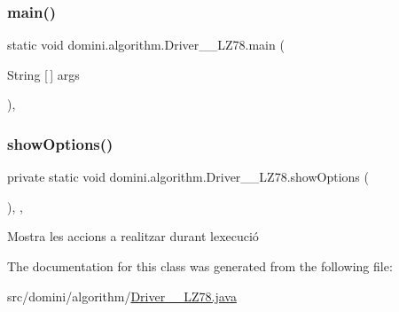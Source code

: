 \subsubsection{\texorpdfstring{main()}{main()}}
{\footnotesize\ttfamily static void domini.\+algorithm.\+Driver\+\_\+\+\_\+\+L\+Z78.\+main (\begin{DoxyParamCaption}\item[{String \mbox{[}$\,$\mbox{]}}]{args }\end{DoxyParamCaption})\hspace{0.3cm}{\ttfamily [inline]}, {\ttfamily [static]}}

\mbox{\label{classdomini_1_1algorithm_1_1Driver____LZ78_af5e77bd40dbe6c3fa84ee5ee996b6dfe}} 
\subsubsection{\texorpdfstring{show\+Options()}{showOptions()}}
{\footnotesize\ttfamily private static void domini.\+algorithm.\+Driver\+\_\+\+\_\+\+L\+Z78.\+show\+Options (\begin{DoxyParamCaption}{ }\end{DoxyParamCaption})\hspace{0.3cm}{\ttfamily [inline]}, {\ttfamily [static]}, {\ttfamily [private]}}



Mostra les accions a realitzar durant l\textquotesingle{}execució 



The documentation for this class was generated from the following file\+:\begin{DoxyCompactItemize}
\item 
src/domini/algorithm/\hyperlink{Driver____LZ78_8java}{Driver\+\_\+\+\_\+\+L\+Z78.\+java}\end{DoxyCompactItemize}
